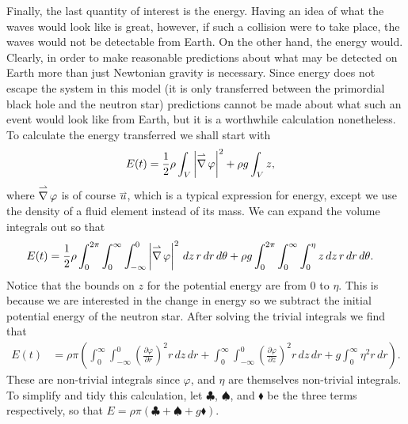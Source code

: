 Finally, the last quantity of interest is the energy. Having an idea of what the waves would look like is great, however, if such a collision were to take place, the waves would not be detectable from Earth. On the other hand, the energy would. Clearly, in order to make reasonable predictions about what may be detected on Earth more than just Newtonian gravity is necessary. Since energy does not escape the system in this model (it is only transferred between the primordial black hole and the neutron star) predictions cannot be made about what such an event would look like from Earth, but it is a worthwhile calculation nonetheless. \\

To calculate the energy transferred we shall start with
\begin{align*}
E(t) &= \frac{1}{2} \rho \int_V \left| \operatorname{\overset{\rightharpoonup}\nabla} \varphi \right|^2 + \rho g \int_V z,
\end{align*}
where $\operatorname{\overset{\rightharpoonup}\nabla} \varphi$ is of course $\overset{\rightharpoonup}u$, which is a typical expression for energy, except we use the density of a fluid element instead of its mass. We can expand the volume integrals out so that 
\begin{align*}
E(t) &= \frac{1}{2} \rho \int_0^{2\pi} \int_0^\infty \int_{-\infty}^0 \left| \operatorname{\overset{\rightharpoonup}\nabla} \varphi \right|^2 \, dz \, r \, dr \, d\theta + \rho g \int_0^{2\pi} \int_0^\infty \int_0^\eta z \, dz \, r \, dr \, d\theta.
\end{align*}
Notice that the bounds on $z$ for the potential energy are from $0$ to $\eta$. This is because we are interested in the change in energy so we subtract the initial potential energy of the neutron star. After solving the trivial integrals we find that
\begin{align*}
E(t) &= \rho \pi \left( \int_0^\infty \int_{-\infty}^0 \left( \frac{\partial \varphi}{\partial r} \right)^2 r \, dz \, dr + \int_0^\infty \int_{-\infty}^0 \left( \frac{\partial \varphi}{\partial z} \right)^2 r \, dz \, dr + g \int_0^\infty \eta^2 r \, dr \right).
\end{align*}
These are non-trivial integrals since $\varphi$, and $\eta$ are themselves non-trivial integrals. To simplify and tidy this calculation, let $\clubsuit$, $\spadesuit$, and $\blacklozenge$ be the three terms respectively, so that $E = \rho \pi (\clubsuit + \spadesuit + g \blacklozenge)$. \\

